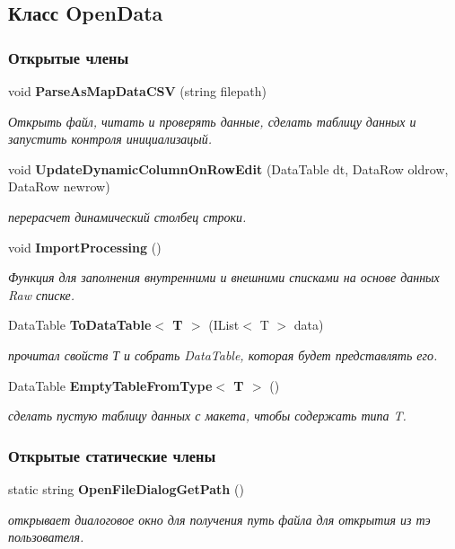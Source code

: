 \subsection{Класс Open\+Data}
\label{classkdz__manager_1_1_open_data}
\subsubsection*{Открытые члены}
\begin{DoxyCompactItemize}
\item 
void {\bf Parse\+As\+Map\+Data\+C\+S\+V} (string filepath)
\begin{DoxyCompactList}\small\item\em Открыть файл, читать и проверять данные, сделать таблицу данных и запустить контроля инициализацый. \end{DoxyCompactList}\item 
void {\bf Update\+Dynamic\+Column\+On\+Row\+Edit} (Data\+Table dt, Data\+Row oldrow, Data\+Row newrow)
\begin{DoxyCompactList}\small\item\em перерасчет динамический столбец строки. \end{DoxyCompactList}\item 
void {\bf Import\+Processing} ()
\begin{DoxyCompactList}\small\item\em Функция для заполнения внутренними и внешними списками на основе данных Raw списке. \end{DoxyCompactList}\item 
Data\+Table {\bf To\+Data\+Table$<$ T $>$} (I\+List$<$ T $>$ data)
\begin{DoxyCompactList}\small\item\em прочитал свойств Т и собрать Data\+Table, которая будет представлять его. \end{DoxyCompactList}\item 
Data\+Table {\bf Empty\+Table\+From\+Type$<$ T $>$} ()
\begin{DoxyCompactList}\small\item\em сделать пустую таблицу данных с макета, чтобы содержать типа T. \end{DoxyCompactList}\end{DoxyCompactItemize}
\subsubsection*{Открытые статические члены}
\begin{DoxyCompactItemize}
\item 
static string {\bf Open\+File\+Dialog\+Get\+Path} ()
\begin{DoxyCompactList}\small\item\em открывает диалоговое окно для получения путь файла для открытия из тэ пользователя. \end{DoxyCompactList}\end{DoxyCompactItemize}
